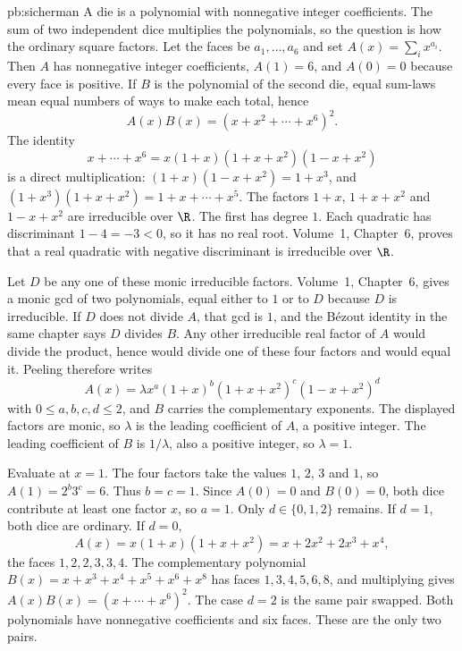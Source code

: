 \begin{solution}{pb:sicherman}
\idea A die is a polynomial with nonnegative integer coefficients. The sum of two independent dice multiplies the polynomials, so the question is how the ordinary square factors.
\writeup Let the faces be $a_1,\ldots,a_6$ and set $A(x)=\sum_i x^{a_i}$. Then $A$ has nonnegative integer coefficients, $A(1)=6$, and $A(0)=0$ because every face is positive. If $B$ is the polynomial of the second die, equal sum-laws mean equal numbers of ways to make each total, hence
\[
 A(x)B(x)=(x+x^2+\cdots+x^6)^2.
\]
The identity
\[
 x+\cdots+x^6=x(1+x)(1+x+x^2)(1-x+x^2)
\]
is a direct multiplication: $(1+x)(1-x+x^2)=1+x^3$, and $(1+x^3)(1+x+x^2)=1+x+\cdots+x^5$. The factors $1+x$, $1+x+x^2$ and $1-x+x^2$ are irreducible over $\R$. The first has degree $1$. Each quadratic has discriminant $1-4=-3<0$, so it has no real root. Volume~1, Chapter~6, proves that a real quadratic with negative discriminant is irreducible over $\R$.

Let $D$ be any one of these monic irreducible factors. Volume~1, Chapter~6, gives a monic gcd of two polynomials, equal either to $1$ or to $D$ because $D$ is irreducible. If $D$ does not divide $A$, that gcd is $1$, and the Bézout identity in the same chapter says $D$ divides $B$. Any other irreducible real factor of $A$ would divide the product, hence would divide one of these four factors and would equal it. Peeling therefore writes
\[
 A(x)=\lambda x^a(1+x)^b(1+x+x^2)^c(1-x+x^2)^d
\]
with $0\le a,b,c,d\le2$, and $B$ carries the complementary exponents. The displayed factors are monic, so $\lambda$ is the leading coefficient of $A$, a positive integer. The leading coefficient of $B$ is $1/\lambda$, also a positive integer, so $\lambda=1$.

Evaluate at $x=1$. The four factors take the values $1$, $2$, $3$ and $1$, so $A(1)=2^b3^c=6$. Thus $b=c=1$. Since $A(0)=0$ and $B(0)=0$, both dice contribute at least one factor $x$, so $a=1$. Only $d\in\{0,1,2\}$ remains. If $d=1$, both dice are ordinary. If $d=0$,
\[
 A(x)=x(1+x)(1+x+x^2)=x+2x^2+2x^3+x^4,
\]
the faces $1,2,2,3,3,4$. The complementary polynomial $B(x)=x+x^3+x^4+x^5+x^6+x^8$ has faces $1,3,4,5,6,8$, and multiplying gives $A(x)B(x)=(x+\cdots+x^6)^2$. The case $d=2$ is the same pair swapped. Both polynomials have nonnegative coefficients and six faces. These are the only two pairs.
\end{solution}

